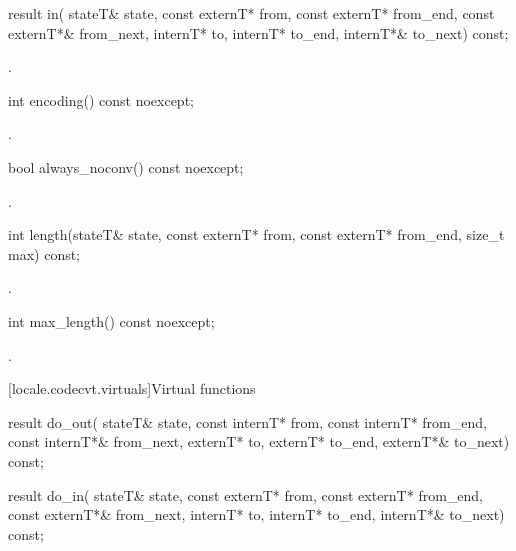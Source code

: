 %
\begin{itemdecl}
result in(
    stateT& state,
    const externT* from, const externT* from_end, const externT*& from_next,
    internT* to, internT* to_end, internT*& to_next) const;
\end{itemdecl}

\begin{itemdescr}
\pnum
\returns
{}.
\end{itemdescr}

%
\begin{itemdecl}
int encoding() const noexcept;
\end{itemdecl}

\begin{itemdescr}
\pnum
\returns
{}.
\end{itemdescr}

%
\begin{itemdecl}
bool always_noconv() const noexcept;
\end{itemdecl}

\begin{itemdescr}
\pnum
\returns
{}.
\end{itemdescr}

%
\begin{itemdecl}
int length(stateT& state, const externT* from, const externT* from_end, size_t max) const;
\end{itemdecl}

\begin{itemdescr}
\pnum
\returns
{}.
\end{itemdescr}

%
\begin{itemdecl}
int max_length() const noexcept;
\end{itemdecl}

\begin{itemdescr}
\pnum
\returns
{}.
\end{itemdescr}

[locale.codecvt.virtuals]{Virtual functions}

%
%
\begin{itemdecl}
result do_out(
    stateT& state,
    const internT* from, const internT* from_end, const internT*& from_next,
    externT* to, externT* to_end, externT*& to_next) const;

result do_in(
    stateT& state,
    const externT* from, const externT* from_end, const externT*& from_next,
    internT* to, internT* to_end, internT*& to_next) const;
\end{itemdecl}

